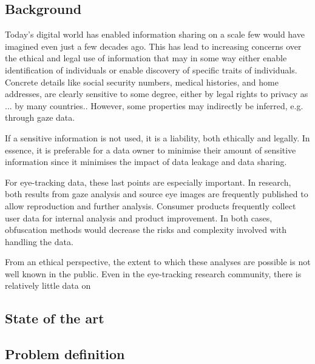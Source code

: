 



\subsection{Background}
Today's digital world has enabled information sharing on a scale few would have imagined even just a few decades ago. This has lead to increasing concerns over the ethical and legal use of information that may in some way either enable identification of individuals or enable discovery of specific traits of individuals. Concrete details like social security numbers, medical histories, and home addresses, are clearly sensitive to some degree, either by legal rights to privacy as ... by many countries.. However, some properties may indirectly be inferred, e.g. through gaze data. 

If a sensitive information is not used, it is a liability, both ethically and legally. In essence, it is preferable for a data owner to minimise their amount of sensitive information since it minimises the impact of data leakage and data sharing. 

For eye-tracking data, these last points are especially important. In research, both results from gaze analysis and source eye images are frequently published to allow reproduction and further analysis. Consumer products frequently collect user data for internal analysis and product improvement. In both cases, obfuscation methods would decrease the risks and complexity involved with handling the data.

From an ethical perspective, the extent to which these analyses are possible is not well known in the public. Even in the eye-tracking research community, there is relatively little data on 


\subsection{State of the art}

\subsection{Problem definition}

